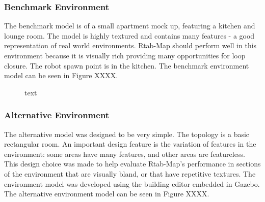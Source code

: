 \documentclass[a4paper]{article}
\begin{document}
\subsubsection{Benchmark Environment}
The benchmark model is of a small apartment mock up, featuring a kitchen and lounge room. The model is highly textured and contains many features - a good representation of real world environments. Rtab-Map should perform well in this environment because it is visually rich providing many opportunities for loop closure. The robot spawn point is in the kitchen. The benchmark environment model can be seen in Figure XXXX.

\begin{figure}[h]
\centering
{}
\caption{text}
\end{figure}

\subsubsection{Alternative Environment}
The alternative model was designed to be very simple. The topology is a basic rectangular room. An important design feature is the variation of features in the environment: some areas have many features, and other areas are featureless. This design choice was made to help evaluate Rtab-Map's performance in sections of the environment that are visually bland, or that have repetitive textures. The environment model was developed using the building editor embedded in Gazebo. The alternative environment model can be seen in Figure XXXX.
\end{document}
